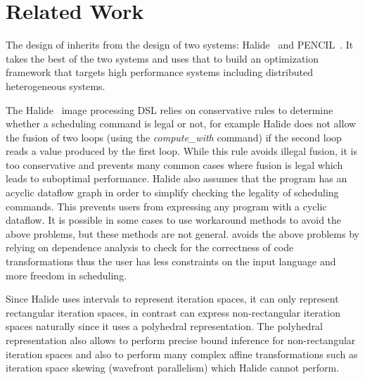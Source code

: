 \section{Related Work}

The design of \framework{} inherits from the design of two systems: Halide~\cite{halide_12} and PENCIL~\cite{pencil_paper}. It takes the best of the two systems and uses that to build an optimization framework that targets high performance systems including distributed heterogeneous systems.

The Halide~\cite{halide_12} image processing DSL relies on conservative rules to determine whether a scheduling command is legal or not, for example Halide does not allow the fusion of two loops (using the \textit{compute\_with} command) if the second loop reads a value produced by the first loop.
While this rule avoids illegal fusion, it is too conservative and prevents many common cases where fusion is legal which leads to suboptimal performance.
Halide also assumes that the program has an acyclic dataflow graph in order to simplify checking the legality of scheduling commands. This prevents users from expressing any program with a cyclic dataflow.
It is possible in some cases to use workaround methods to avoid the above problems, but these methods are not general.
\framework{} avoids the above problems by relying on dependence analysis to check for the correctness of code transformations thus the user has less constraints on the input language and more freedom in scheduling.


Since Halide uses intervals to represent iteration spaces, it can only represent rectangular iteration spaces, \framework{} in contrast can express non-rectangular iteration spaces naturally since it uses a polyhedral representation.  The polyhedral representation also allows \framework{} to perform precise bound inference for non-rectangular iteration spaces and also to perform many complex affine transformations such as iteration space skewing (wavefront parallelism) which Halide cannot perform.

